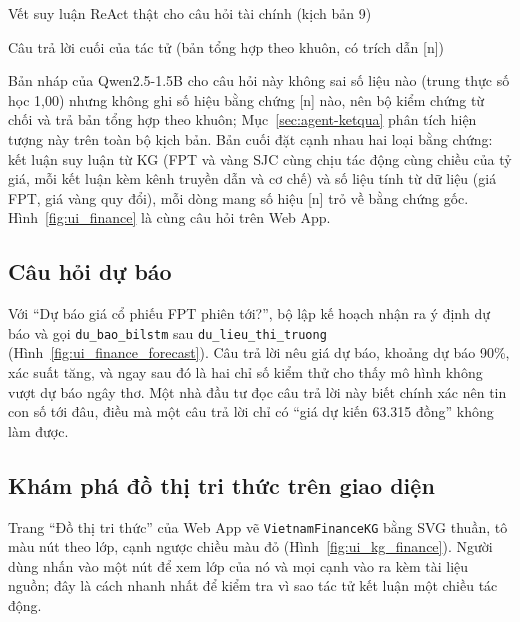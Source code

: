 \begin{vetsuyluan}{Vết suy luận ReAct thật cho câu hỏi tài chính (kịch bản 9)}

\end{vetsuyluan}

\begin{vetsuyluan}{Câu trả lời cuối của tác tử (bản tổng hợp theo khuôn, có trích dẫn [n])}

\end{vetsuyluan}

Bản nháp của Qwen2.5-1.5B cho câu hỏi này không sai số liệu nào (trung thực số học 1,00) nhưng không ghi số hiệu
bằng chứng [n] nào, nên bộ kiểm chứng từ chối và trả bản tổng hợp theo khuôn; Mục~\ref{sec:agent-ketqua} phân tích
hiện tượng này trên toàn bộ kịch bản. Bản cuối đặt cạnh nhau hai loại bằng chứng: kết luận suy luận từ KG (FPT và
vàng SJC cùng chịu tác động cùng chiều của tỷ giá, mỗi kết luận kèm kênh truyền dẫn và cơ chế) và số liệu tính từ dữ
liệu (giá FPT, giá vàng quy đổi), mỗi dòng mang số hiệu [n] trỏ về bằng chứng gốc. Hình~\ref{fig:ui_finance} là cùng
câu hỏi trên Web App.


\subsection{Câu hỏi dự báo}
Với ``Dự báo giá cổ phiếu FPT phiên tới?'', bộ lập kế hoạch nhận ra ý định dự báo và gọi \texttt{du\_bao\_bilstm} sau
\texttt{du\_lieu\_thi\_truong} (Hình~\ref{fig:ui_finance_forecast}). Câu trả lời nêu giá dự báo, khoảng dự báo 90\%,
xác suất tăng, và ngay sau đó là hai chỉ số kiểm thử cho thấy mô hình không vượt dự báo ngây thơ. Một nhà đầu tư đọc
câu trả lời này biết chính xác nên tin con số tới đâu, điều mà một câu trả lời chỉ có ``giá dự kiến 63.315 đồng''
không làm được.


\subsection{Khám phá đồ thị tri thức trên giao diện}
Trang ``Đồ thị tri thức'' của Web App vẽ \texttt{VietnamFinanceKG} bằng SVG thuần, tô màu nút theo lớp, cạnh ngược
chiều màu đỏ (Hình~\ref{fig:ui_kg_finance}). Người dùng nhấn vào một nút để xem lớp của nó và mọi cạnh vào ra kèm
tài liệu nguồn; đây là cách nhanh nhất để kiểm tra vì sao tác tử kết luận một chiều tác động.

